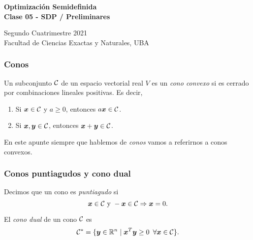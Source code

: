 \documentclass[aspectratio=169,12pt,spanish]{beamer}
\begin{document}

\begin{frame}

 \begin{center}

\Large\textbf{Optimización Semidefinida} \\
\large\textbf{Clase 05 - SDP / Preliminares}




\vspace{1cm}
 Segundo Cuatrimestre 2021
 \\
 {\small Facultad de Ciencias Exactas y Naturales, UBA}
 \end{center}

\end{frame}




\begin{frame}
\frametitle{Conos}

Un subconjunto $\mathcal{C}$ de un espacio vectorial real $V$ es un \emph{cono convexo} si es cerrado por combinaciones lineales positivas. Es decir,
\begin{enumerate}
\item Si $\bm{x} \in \mathcal{C}$ y $a \ge 0$, entonces $a\bm{x} \in \mathcal{C}$.
\item Si $\bm{x}, \bm{y} \in \mathcal{C}$, entonces $\bm{x} + \bm{y} \in \mathcal{C}$.
\end{enumerate}

En este apunte siempre que hablemos de \emph{conos} vamos a referirnos a conos convexos.

\end{frame}


\begin{frame}
\frametitle{Conos puntiagudos y cono dual}

Decimos que un cono es \emph{puntiagudo} si
$$
\bm{x}  \in \mathcal{C} \text{ y } -\bm{x} \in \mathcal{C} \Rightarrow \bm{x} = 0.
$$

El \emph{cono dual} de un cono $\mathcal{C}$ es
$$
\mathcal{C}^* = \{\bm{y} \in \mathbb{R}^n \mid \bm{x}^T \bm{y} \ge 0 \enspace \forall \bm{x} \in \mathcal{C}\}.
$$

\end{frame}
\end{document}
